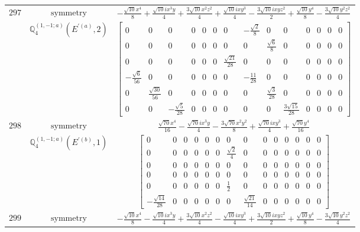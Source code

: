 \documentclass[fleqn,8pt,landscape]{jsarticle}
\begin{document}
\begin{longtable}{ccc}
$ 297 $ & $ \text{symmetry} $ & $ - \frac{\sqrt{10} x^{4}}{8} + \frac{\sqrt{10} i x^{3} y}{4} + \frac{3 \sqrt{10} x^{2} z^{2}}{4} + \frac{\sqrt{10} i x y^{3}}{4} - \frac{3 \sqrt{10} i x y z^{2}}{2} + \frac{\sqrt{10} y^{4}}{8} - \frac{3 \sqrt{10} y^{2} z^{2}}{4} $ \\
$  $ & $ \mathbb{Q}_{4}^{(1,-1;a)}(E^{\prime(a)},2) $ & $ \begin{bmatrix} 0 & 0 & 0 & 0 & 0 & 0 & 0 & - \frac{\sqrt{2}}{8} & 0 & 0 & 0 & 0 & 0 & 0 \\ 0 & 0 & 0 & 0 & 0 & 0 & 0 & 0 & \frac{\sqrt{6}}{8} & 0 & 0 & 0 & 0 & 0 \\ 0 & 0 & 0 & 0 & 0 & 0 & \frac{\sqrt{21}}{28} & 0 & 0 & 0 & 0 & 0 & 0 & 0 \\ - \frac{\sqrt{6}}{56} & 0 & 0 & 0 & 0 & 0 & 0 & - \frac{11}{28} & 0 & 0 & 0 & 0 & 0 & 0 \\ 0 & \frac{\sqrt{30}}{56} & 0 & 0 & 0 & 0 & 0 & 0 & \frac{\sqrt{3}}{28} & 0 & 0 & 0 & 0 & 0 \\ 0 & 0 & - \frac{\sqrt{5}}{28} & 0 & 0 & 0 & 0 & 0 & 0 & \frac{3 \sqrt{15}}{28} & 0 & 0 & 0 & 0 \end{bmatrix} $ \\ \hline
$ 298 $ & $ \text{symmetry} $ & $ \frac{\sqrt{70} x^{4}}{16} - \frac{\sqrt{70} i x^{3} y}{4} - \frac{3 \sqrt{70} x^{2} y^{2}}{8} + \frac{\sqrt{70} i x y^{3}}{4} + \frac{\sqrt{70} y^{4}}{16} $ \\
$  $ & $ \mathbb{Q}_{4}^{(1,-1;a)}(E^{\prime(b)},1) $ & $ \begin{bmatrix} 0 & 0 & 0 & 0 & 0 & 0 & 0 & 0 & 0 & 0 & 0 & 0 & 0 & 0 \\ 0 & 0 & 0 & 0 & 0 & 0 & \frac{\sqrt{2}}{4} & 0 & 0 & 0 & 0 & 0 & 0 & 0 \\ 0 & 0 & 0 & 0 & 0 & 0 & 0 & 0 & 0 & 0 & 0 & 0 & 0 & 0 \\ 0 & 0 & 0 & 0 & 0 & 0 & 0 & 0 & 0 & 0 & 0 & 0 & 0 & 0 \\ 0 & 0 & 0 & 0 & 0 & 0 & \frac{1}{2} & 0 & 0 & 0 & 0 & 0 & 0 & 0 \\ - \frac{\sqrt{14}}{28} & 0 & 0 & 0 & 0 & 0 & 0 & \frac{\sqrt{21}}{14} & 0 & 0 & 0 & 0 & 0 & 0 \end{bmatrix} $ \\ \hline
$ 299 $ & $ \text{symmetry} $ & $ - \frac{\sqrt{10} x^{4}}{8} - \frac{\sqrt{10} i x^{3} y}{4} + \frac{3 \sqrt{10} x^{2} z^{2}}{4} - \frac{\sqrt{10} i x y^{3}}{4} + \frac{3 \sqrt{10} i x y z^{2}}{2} + \frac{\sqrt{10} y^{4}}{8} - \frac{3 \sqrt{10} y^{2} z^{2}}{4} $ \\

\end{longtable}
\end{document}
